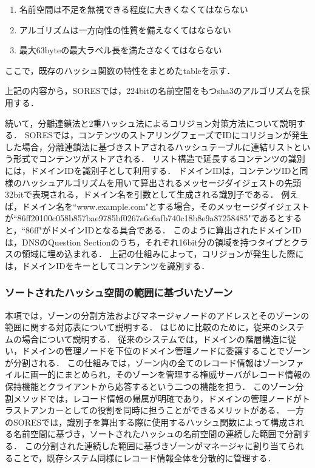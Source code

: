 \begin{enumerate}
 \item 名前空間は不足を無視できる程度に大きくなくてはならない
 \vspace{-3mm}
 \item アルゴリズムは一方向性の性質を備えなくてはならない
 \vspace{-3mm}
 \item 最大63byteの最大ラベル長を満たさなくてはならない
 \vspace{-3mm}
\end{enumerate}

ここで，既存のハッシュ関数の特性をまとめたtableを示す．

上記の内容から，SORESでは，224bitの名前空間をもつsha3のアルゴリズムを採用する．

続いて，分離連鎖法と2重ハッシュ法によるコリジョン対策方法について説明する．
SORESでは，コンテンツのストアリングフェーズでIDにコリジョンが発生した場合，分離連鎖法に基づきストアされるハッシュテーブルに連結リストという形式でコンテンツがストアされる．
リスト構造で延長するコンテンツの識別には，ドメインIDを識別子として利用する．
ドメインIDは，コンテンツIDと同様のハッシュアルゴリズムを用いて算出されるメッセージダイジェストの先頭32bitで表現される，ドメイン名を引数として生成される識別子である．
例えば，ドメイン名を``www.example.com"とする場合，そのメッセージダイジェストが``86ff20100c058b857bae9785bf0267e6c6afb740c18b8e9a87258485"であるとすると，``86ff"がドメインIDとなる具合である．
このように算出されたドメインIDは，DNSのQuestion Sectionのうち，それぞれ16bit分の領域を持つタイプとクラスの領域に埋め込まれる．
上記の仕組みによって，コリジョンが発生した際には，ドメインIDをキーとしてコンテンツを識別する．


\subsubsection{ソートされたハッシュ空間の範囲に基づいたゾーン}
本項では，ゾーンの分割方法およびマネージャノードのアドレスとそのゾーンの範囲に関する対応表について説明する．
はじめに比較のために，従来のシステムの場合について説明する．
従来のシステムでは，ドメインの階層構造に従い，ドメインの管理ノードを下位のドメイン管理ノードに委譲することでゾーンが分割される．
この仕組みでは，ゾーン内の全てのレコード情報はゾーンファイルに画一的にまとめられ，そのゾーンを管理する権威サーバがレコード情報の保持機能とクライアントから応答するという二つの機能を担う．
このゾーン分割メソッドでは，レコード情報の帰属が明確であり，ドメインの管理ノードがトラストアンカーとしての役割を同時に担うことができるメリットがある．
一方のSORESでは，識別子を算出する際に使用するハッシュ関数によって構成される名前空間に基づき，ソートされたハッシュの名前空間の連続した範囲で分割する．
この分割された連続した範囲に基づきゾーンがマネージャに割り当てられることで，既存システム同様にレコード情報全体を分散的に管理する．

